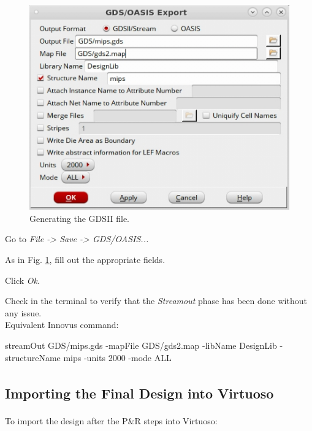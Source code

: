 \begin{enumerate}
	\parbox[t]{\dimexpr\textwidth-\leftmargin}{%
		\begin{figure}
			\vspace{-6mm}
			\centering
			\vspace{-\baselineskip}
			\includegraphics[scale=0.45]{figures/lab5_backend/export_gds}
			\caption{Generating the GDSII file.}
			\label{export_gds}
		\end{figure}
		\item Go to \textit{File -> Save -> GDS/OASIS...}
		\item As in Fig. \ref{export_gds}, fill out the appropriate fields.
		\item Click \textit{Ok}.
		\item Check in the terminal to verify that the \textit{Streamout} phase has been done without any issue. \\
		Equivalent Innovus command:
		\begin{codeline}
			streamOut GDS/mips.gds -mapFile GDS/gds2.map -libName DesignLib -structureName mips -units 2000 -mode ALL
		\end{codeline}
	} 
\end{enumerate}


\subsection{Importing the Final Design into Virtuoso\textsuperscript{\tiny\textregistered}}
To import the design after the P$\&$R steps into Virtuoso\textsuperscript{\tiny\textregistered}:

